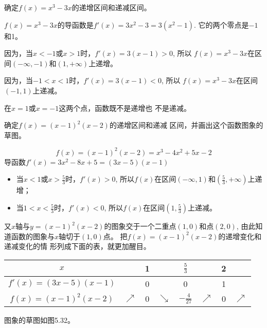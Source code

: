 \begin{example}
  确定$f(x)=x^3-3x$的递增区间和递减区间。  
\end{example}

\begin{solution}
$f(x)=x^3-3x$的导函数是$f'(x)=3x^2-3=3(x^2-
1)$. 它的两个零点是$-1$和1。

因为，当$x<-1$或$x>1$时，$f'(x)=3(x-1)>0$, 所以
$f(x)=x^3-3x$在区间$(-\infty,-1)$和$(1,+\infty)$上递增。

因为，当$-1<x<1$时，$f'(x)=3(x-1)<0$, 所以
$f(x)=x^3-3x$在区间$(-1,1)$上递减。
\end{solution}

\begin{rmk}
在$x=1$或$x=-1$这两个点，函数既不是递增也
不是递减。
\end{rmk}

\begin{example}
    确定$f(x)=(x-1)^2(x-2)$的递增区间和递减
区间，并画出这个函数图象的草图。
\end{example}

\begin{solution}
\[f(x)=(x-1)^2(x-2)=x^3-4x^2+5x-2\]
导函数$f'(x)=3x^2-8x+5=(3x-5)(x-1)$

\begin{itemize}
    \item 当$x<1$或$x>\frac{5}{3}$时，$f'(x)>0$, 所以$f(x)$在区间$(-\infty,1)$和$\left(\frac{5}{3},+\infty\right)$上递增；
    \item 当$1<x<\frac{5}{3}$时，$f'(x)<0$, 所以$f(x)$在区间$\left(1,\frac{5}{3}\right)$上递减。
\end{itemize}

又$x$轴与$y=(x-1)^2(x-2)$的图象交于一个二重点$(1,
0)$和点$(2,0)$, 由此知道函数的图象与$x$轴切于$(1,0)$点。
把$f(x)=(x-1)^2(x-2)$的递增变化和递减变化的情
形列成下面的表，就更加醒目。

\begin{center}
\begin{tabular}{c|ccccccc}
    \hline
$x$&&1&&$\tfrac{5}{3}$&&2\\
    \hline
$f'(x)=(3x-5)(x-1)$&&0&&0&&1\\
$f(x)=(x-1)^2(x-2)$&$\nearrow$&0&$\searrow$&$-\tfrac{4}{27}$&$\nearrow$&0&$\nearrow$\\
    \hline
\end{tabular}
\end{center}
图象的草图如图5.32。
\begin{figure}[htp]
    \centering
{}
    \caption{}
\end{figure}
\end{solution}


